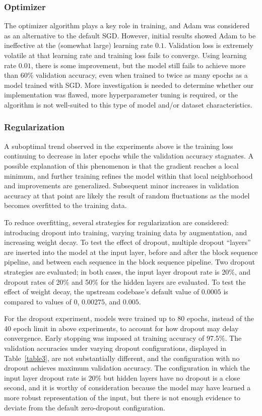 \documentclass[letterpaper]{article} %
\begin{document}
\subsubsection{Optimizer}

The optimizer algorithm plays a key role in training, and Adam was considered as an alternative to the default SGD\@.
However, initial results showed Adam to be ineffective at the (somewhat large) learning rate $ 0.1 $.
Validation loss is extremely volatile
at that learning rate and training loss fails to converge.
Using learning rate $ 0.01 $, there is some improvement, but the model still fails to achieve more than 60\% validation
accuracy, even when trained to twice as many epochs as a model trained with SGD. More investigation is needed to
determine whether our implementation was flawed, more hyperparameter tuning is required, or
the algorithm is not well-suited to this type of model and/or dataset characteristics.

\subsubsection{Regularization}

A suboptimal trend observed in the experiments above is the training loss continuing to decrease in later
epochs while the validation accuracy stagnates.
A possible explanation of this phenomenon is that the gradient reaches a local minimum, and further training
refines the model within that local neighborhood and improvements are generalized.
Subsequent minor increases in validation accuracy at that point are likely the result of random fluctuations as the
model becomes overfitted to the training data.

To reduce overfitting, several strategies for regularization are considered:
introducing dropout into training, varying training data by augmentation, and increasing weight decay.
To test the effect of dropout, multiple dropout ``layers'' are inserted into the model at the input layer, before and
after the block sequence pipeline, and between each sequence in the block sequence pipeline.
Two dropout strategies are evaluated; in both cases, the input layer dropout rate is 20\%, and dropout rates of 20\%
and 50\% for the hidden layers are evaluated.
To test the effect of weight decay, the upstream codebase's default value of $ 0.0005 $ is compared to values of
$ 0 $, $ 0.00275 $, and $ 0.005 $.

For the dropout experiment, models were trained up to 80 epochs, instead of the 40 epoch limit in above experiments,
to account for how dropout may delay convergence.
Early stopping was imposed at training accuracy of 97.5\%.
The validation accuracies under varying dropout configurations, displayed in Table~\ref{table3},
are not substantially different, and the configuration with no dropout achieves maximum validation accuracy.
The configuration in which the input layer dropout rate is 20\% but hidden layers have no dropout
is a close second, and it is worthy of consideration because the model may have learned a more robust
representation of the input, but there is not enough evidence to deviate from the default zero-dropout
configuration.
\end{document}
